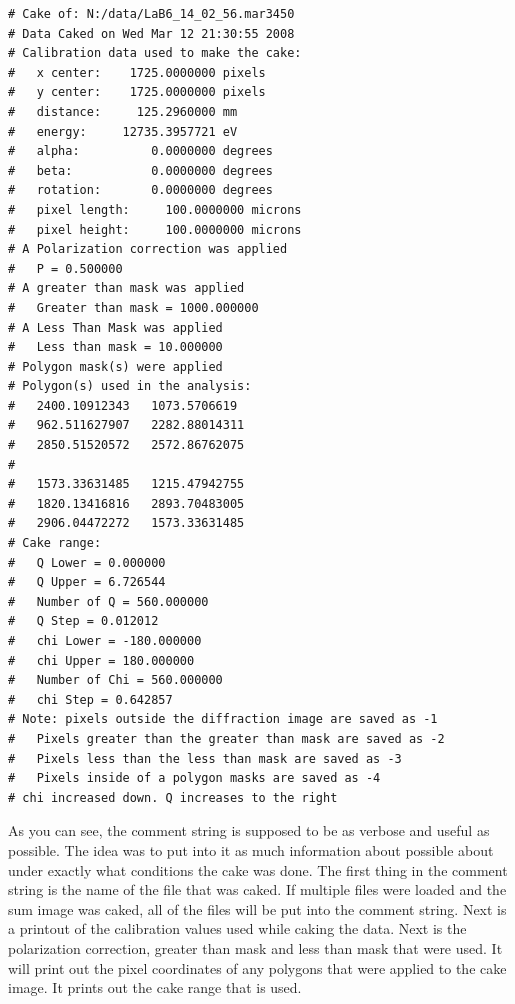\begin{lstlisting}[caption={'The Cake Data Header'}]
# Cake of: N:/data/LaB6_14_02_56.mar3450 
# Data Caked on Wed Mar 12 21:30:55 2008
# Calibration data used to make the cake:
#   x center:    1725.0000000 pixels
#   y center:    1725.0000000 pixels
#   distance:     125.2960000 mm
#   energy:     12735.3957721 eV
#   alpha:          0.0000000 degrees
#   beta:           0.0000000 degrees
#   rotation:       0.0000000 degrees
#   pixel length:     100.0000000 microns
#   pixel height:     100.0000000 microns
# A Polarization correction was applied
#   P = 0.500000
# A greater than mask was applied
#   Greater than mask = 1000.000000
# A Less Than Mask was applied
#   Less than mask = 10.000000
# Polygon mask(s) were applied
# Polygon(s) used in the analysis:
#   2400.10912343	1073.5706619
#   962.511627907	2282.88014311
#   2850.51520572	2572.86762075
#
#   1573.33631485	1215.47942755
#   1820.13416816	2893.70483005
#   2906.04472272	1573.33631485
# Cake range:
#   Q Lower = 0.000000
#   Q Upper = 6.726544
#   Number of Q = 560.000000
#   Q Step = 0.012012
#   chi Lower = -180.000000
#   chi Upper = 180.000000
#   Number of Chi = 560.000000
#   chi Step = 0.642857
# Note: pixels outside the diffraction image are saved as -1
#   Pixels greater than the greater than mask are saved as -2
#   Pixels less than the less than mask are saved as -3
#   Pixels inside of a polygon masks are saved as -4
# chi increased down. Q increases to the right
\end{lstlisting}
As you can see, the comment string is supposed to be as verbose
and useful as possible. The idea was to put into it as much
information about possible about under exactly what conditions
the cake was done. The first thing in the comment string is
the name of the file that was caked. If multiple files were loaded
and the sum image was caked, all of the files will be put into
the comment string. Next is a printout of the calibration values
used while caking the data. Next is the polarization correction,
greater than mask and less than mask that were used. It will print
out the pixel coordinates of any polygons that were applied to
the cake image. It prints out the cake range that is used.

